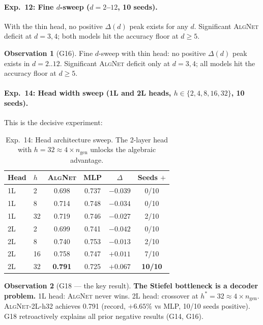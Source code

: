 \documentclass[11pt,a4paper]{article}
\newcommand{\ngen}{n_{\mathrm{gen}}}
\newcommand{\AlgNet}{\textsc{AlgNet}}
\theoremstyle{definition}
\newtheorem{observation}{Observation}
\begin{document}
\paragraph{Exp.~12: Fine $d$-sweep ($d = 2$--$12$, 10 seeds).}
With the thin head, no positive $\Delta(d)$ peak exists for any $d$. 
Significant \AlgNet{} deficit at $d = 3, 4$; both models hit the 
accuracy floor at $d \geq 5$.

\begin{observation}[G16]
Fine $d$-sweep with thin head: no positive $\Delta(d)$ peak exists in 
$d = 2..12$. Significant \AlgNet{} deficit only at $d = 3, 4$; all 
models hit the accuracy floor at $d \geq 5$.
\end{observation}

\paragraph{Exp.~14: Head width sweep (1L and 2L heads, $h \in \{2, 4, 8, 16, 32\}$, 10 seeds).}
This is the decisive experiment:

\begin{table}[H]
\centering
\caption{Exp.~14: Head architecture sweep. The 2-layer head with 
$h = 32 \approx 4 \times \ngen$ unlocks the algebraic advantage.}
\label{tab:exp14}
\begin{tabular}{llcccc}
\toprule
Head & $h$ & \AlgNet{} & MLP & $\Delta$ & Seeds $+$ \\
\midrule
1L & 2  & 0.698 & 0.737 & $-0.039$ & 0/10 \\
1L & 8  & 0.714 & 0.748 & $-0.034$ & 0/10 \\
1L & 32 & 0.719 & 0.746 & $-0.027$ & 2/10 \\
\midrule
2L & 2  & 0.699 & 0.741 & $-0.042$ & 0/10 \\
2L & 8  & 0.740 & 0.753 & $-0.013$ & 2/10 \\
2L & 16 & 0.758 & 0.747 & $+0.011$ & 7/10 \\
2L & 32 & \textbf{0.791} & 0.725 & $+\mathbf{0.067}$ & \textbf{10/10} \\
\bottomrule
\end{tabular}
\end{table}

\begin{observation}[G18 --- the key result]
\textbf{The Stiefel bottleneck is a decoder problem.} 1L head: \AlgNet{} 
never wins. 2L head: crossover at $h^* = 32 \approx 4 \times \ngen$. 
\AlgNet{}-2L-h32 achieves 0.791 (record, $+6.65\%$ vs MLP, 10/10 seeds 
positive). G18 retroactively explains all prior negative results (G14, G16).
\end{observation}
\end{document}
